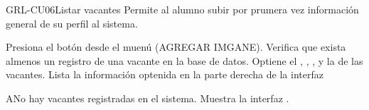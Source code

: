 \begin{UseCase}[]{GRL-CU06}{Listar vacantes}{
	Permite al alumno subir por prumera vez información general de su perfil al sistema.
}
\end{UseCase}

\begin{UCtrayectoria}
	\UCpaso [\UCactor] Presiona el botón  desde el muenú (AGREGAR IMGANE).
    \UCpaso [\UCsist] Verifica que exista almenos un registro de una vacante en la base de datos.
	\UCpaso [\UCsist] Optiene el , , 
	,  y la   de las vacantes.
	\UCpaso [\UCsist] Lista la información optenida en la parte derecha de la interfaz 
\end{UCtrayectoria}

\begin{UCtrayectoriaA}{A}{No hay vacantes registradas en el sistema.}
	\UCpaso [\UCsist] Muestra la interfaz .
\end{UCtrayectoriaA}

